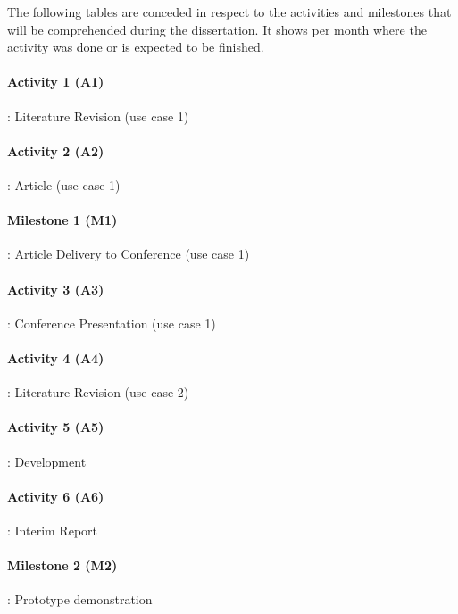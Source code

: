 The following tables are conceded in respect to the activities and milestones that will be comprehended during the dissertation. It shows per month where the activity was done or is expected to be finished.

\paragraph{Activity 1 (A1)}: Literature Revision (use case 1) \mbox{}\\

\paragraph{Activity 2 (A2)}: Article (use case 1) \mbox{}\\

\paragraph{Milestone 1 (M1)}: Article Delivery to Conference (use case 1)\mbox{}\\

\paragraph{Activity 3 (A3)}: Conference Presentation (use case 1) \mbox{}\\

\paragraph{Activity 4 (A4)}: Literature Revision (use case 2) \mbox{}\\

\paragraph{Activity 5 (A5)}: Development \mbox{}\\

\paragraph{Activity 6 (A6)}: Interim Report \mbox{}\\

\paragraph{Milestone 2 (M2)}: Prototype demonstration \mbox{}\\


